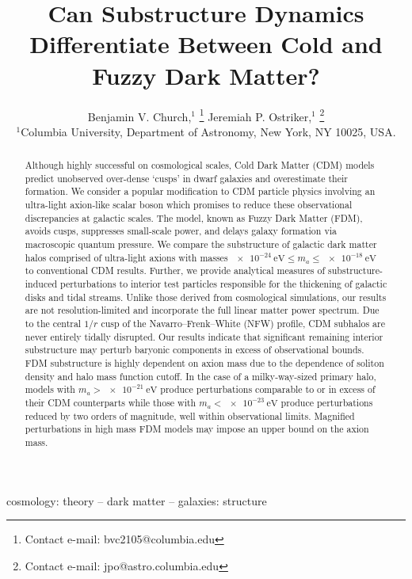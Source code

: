 \documentclass[usenatbib]{mnras}
\newcommand{\squote}[1]{\lq #1\rq}
\newcommand{\poweV}[1]{\SI{e#1}{\electronvolt}}
\begin{document}
\title[Substructure Dynamics]{Can Substructure Dynamics Differentiate Between Cold and Fuzzy Dark Matter?}
\author[B. V. Church and J. P. Ostriker]{
Benjamin V. Church,$^{1}$ \thanks{Contact e-mail: bvc2105@columbia.edu}
Jeremiah P. Ostriker,$^{1}$ \thanks{Contact e-mail: jpo@astro.columbia.edu}
\\
$^{1}$Columbia University, Department of Astronomy, New York, NY 10025, USA.}
\maketitle
\begin{abstract}
Although highly successful on cosmological scales, Cold Dark Matter (CDM) models predict unobserved over-dense \squote{cusps} in dwarf galaxies and overestimate their formation. We consider a popular modification to CDM particle physics involving an ultra-light axion-like scalar boson which promises to reduce these observational discrepancies at galactic scales. The model, known as Fuzzy Dark Matter (FDM), avoids cusps, suppresses small-scale power, and delays galaxy formation via macroscopic quantum pressure. We compare the substructure of galactic dark matter halos comprised of ultra-light axions with masses $\poweV{-24} \leq m_a \leq \poweV{-18}$ to conventional CDM results. Further, we provide analytical measures of substructure-induced perturbations to interior test particles responsible for the thickening of galactic disks and tidal streams. Unlike those derived from cosmological simulations, our results are not resolution-limited and incorporate the full linear matter power spectrum. Due to the central $1/r$ cusp of the Navarro--Frenk--White (NFW) profile, CDM subhalos are never entirely tidally disrupted. Our results indicate that significant remaining interior substructure may perturb baryonic components in excess of observational bounds. FDM substructure is highly dependent on axion mass due to the dependence of soliton density and halo mass function cutoff. In the case of a milky-way-sized primary halo, models with $m_a > \poweV{-21}$ produce perturbations comparable to or in excess of their CDM counterparts while those with $m_a  < \poweV{-23}$ produce perturbations reduced by two orders of magnitude, well within observational limits. Magnified perturbations in high mass FDM models may impose an upper bound on the axion mass.  
\end{abstract}

\begin{keywords}
cosmology: theory -- dark matter -- galaxies: structure
\end{keywords}
\end{document}
